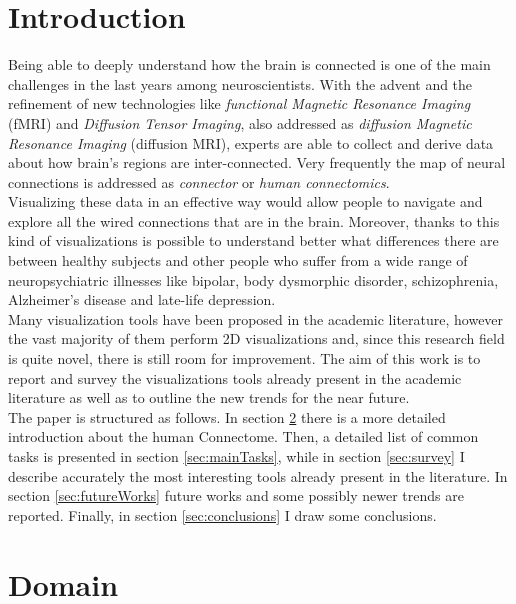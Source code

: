 \documentclass{article}
\begin{document}
\begin{multicols}{2}
\raggedcolumns

\section{Introduction}
\label{sec:introduction}

Being able to deeply understand how the brain is connected is one of the main challenges in the last years among neuroscientists. With the advent and the refinement of new technologies like \textit{functional Magnetic Resonance Imaging} (fMRI) and \textit{Diffusion Tensor Imaging}, also addressed as \textit{diffusion Magnetic Resonance Imaging} (diffusion MRI), experts are able to collect and derive data about how brain's regions are inter-connected. Very frequently the map of neural connections is addressed as \textit{connector} or \textit{human connectomics}.\\
Visualizing these data in an effective way would allow people to navigate and explore all the wired connections that are in the brain. Moreover, thanks to this kind of visualizations is possible to understand better what differences there are between healthy subjects and other people who suffer from a wide range of neuropsychiatric illnesses like bipolar, body dysmorphic disorder, schizophrenia, Alzheimer's disease and late-life depression. \\
Many visualization tools have been proposed in the academic literature, however the vast majority of them perform 2D visualizations and, since this research field is quite novel, there is still room for improvement.
The aim of this work is to report and survey the visualizations tools already present in the academic literature as well as to outline the new trends for the near future.\\
The paper is structured as follows. In section \ref{sec:domain} there is a more detailed introduction about the human Connectome. Then, a detailed list of common tasks is presented in section \ref{sec:mainTasks}, while in section \ref{sec:survey} I describe accurately the most interesting tools already present in the literature. In section \ref{sec:futureWorks} future works and some possibly newer trends are reported. Finally, in section \ref{sec:conclusions} I draw some conclusions.


\section{Domain}
\label{sec:domain}


\end{multicols}
\end{document}
